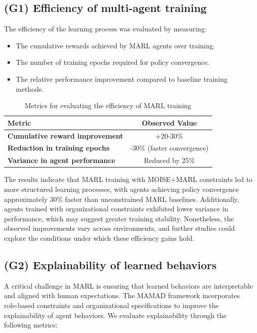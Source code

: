 \documentclass[pdflatex,sn-mathphys-num]{sn-jnl}%
\theoremstyle{thmstyleone}%
\theoremstyle{thmstyletwo}%
\theoremstyle{thmstylethree}%
\begin{document}
\subsection{(G1) Efficiency of multi-agent training}

The efficiency of the learning process was evaluated by measuring:
\begin{itemize}
    \item The cumulative rewards achieved by MARL agents over training.
    \item The number of training epochs required for policy convergence.
    \item The relative performance improvement compared to baseline training methods.
\end{itemize}

\begin{table}[h!]
    \centering
    \caption{Metrics for evaluating the efficiency of MARL training}
    \begin{tabular}{|l|c|}
        \hline
        \textbf{Metric} & \textbf{Observed Value} \\
        \hline
        \textbf{Cumulative reward improvement} & +20-30\% \\
        \hline
        \textbf{Reduction in training epochs} & -30\% (faster convergence) \\
        \hline
        \textbf{Variance in agent performance} & Reduced by 25\% \\
        \hline
    \end{tabular}
    \label{tab:efficiency}
\end{table}

The results indicate that MARL training with MOISE+MARL constraints led to more structured learning processes, with agents achieving policy convergence approximately 30\% faster than unconstrained MARL baselines. Additionally, agents trained with organizational constraints exhibited lower variance in performance, which may suggest greater training stability. Nonetheless, the observed improvements vary across environments, and further studies could explore the conditions under which these efficiency gains hold.

\subsection{(G2) Explainability of learned behaviors}

A critical challenge in MARL is ensuring that learned behaviors are interpretable and aligned with human expectations. The MAMAD framework incorporates role-based constraints and organizational specifications to improve the explainability of agent behaviors. We evaluate explainability through the following metrics:
\end{document}
